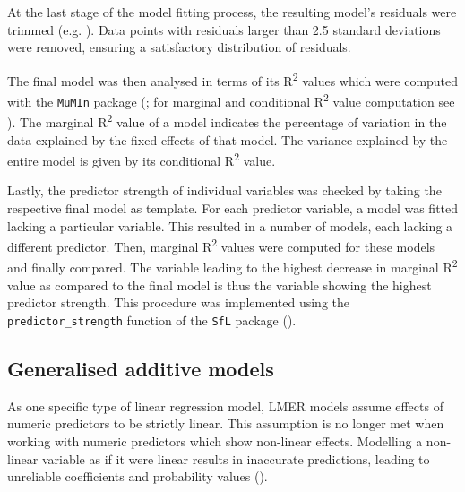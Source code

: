 At the last stage of the model fitting process, the resulting model’s residuals were trimmed (e.g. \cite{Baayen2010}). Data points with residuals larger than 2.5 standard deviations were removed, ensuring a satisfactory distribution of residuals.

The final model was then analysed in terms of its R\textsuperscript{2} values which were computed with the \texttt{MuMIn} package (\cite{Barton2020}; for marginal and conditional R\textsuperscript{2} value computation see \cite{Nakagawa2017}). The marginal R\textsuperscript{2} value of a model indicates the percentage of variation in the data explained by the fixed effects of that model. The variance explained by the entire model is given by its conditional R\textsuperscript{2} value.	

Lastly, the predictor strength of individual variables was checked by taking the respective final model as template. For each predictor variable, a model was fitted lacking a particular variable. This resulted in a number of models, each lacking a different predictor. Then, marginal R\textsuperscript{2} values were computed for these models and finally compared. The variable leading to the highest decrease in marginal R\textsuperscript{2} value as compared to the final model is thus the variable showing the highest predictor strength. This procedure was implemented using the \texttt{predictor\_strength} function of the \texttt{SfL} package (\cite{Schmitz2021sfl}).

\subsection{Generalised additive models}\label{section03_2_2}

As one specific type of linear regression model, LMER models assume effects of numeric predictors to be strictly linear. This assumption is no longer met when working with numeric predictors which show non-linear effects. Modelling a non-linear variable as if it were linear results in inaccurate predictions, leading to unreliable coefficients and probability values (\cite{Baayen2020}). 

